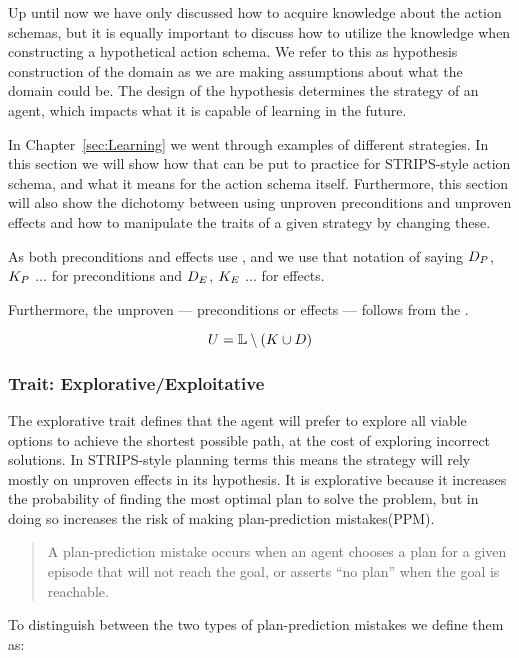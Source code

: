 \documentclass[\master/Master.tex]{subfiles}
\begin{document}
	Up until now we have only discussed how to acquire knowledge about the action schemas, but it is equally important to discuss how to utilize the knowledge when constructing a hypothetical action schema.
	We refer to this as hypothesis construction of the domain as we are making assumptions about what the domain could be.
	The design of the hypothesis determines the strategy of an agent, which impacts what it is capable of learning in the future.

	In Chapter~\ref{sec:Learning} we went through examples of different strategies. In this section we will show how that can be put to practice for STRIPS-style action schema, and what it means for the action schema itself.
	Furthermore, this section will also show the dichotomy between using unproven preconditions and unproven effects and how to manipulate the traits of a given strategy by changing these.

	As both preconditions and effects use \Pro, \Dsp and \Up we use that notation of saying $D_P$, $K_P$ $\dots$ for preconditions and
	$D_E$, $K_E$ $\dots$ for effects.
	
	Furthermore, the unproven \Up --- preconditions or effects --- follows from the .
	
	\begin{equation}
		 U = \mathbb{L} \setminus (K \cup D)
	\end{equation}

\subsubsection{Trait: Explorative/Exploitative}

	The explorative trait defines that the agent will prefer to explore all viable options to achieve the shortest possible path, at the cost of exploring incorrect solutions.
	In STRIPS-style planning terms this means the strategy will rely mostly on unproven effects in its hypothesis.
	It is explorative because it increases the probability of finding the most optimal plan to solve the problem,
	but in doing so increases the risk of making plan-prediction mistakes(PPM).
	\begin{quotation}
				A plan-prediction mistake occurs when an
				agent chooses a plan for a given episode that will not reach
				the goal, or asserts “no plan” when the goal is reachable. \cite{Walsh2008}
	\end{quotation}
	To distinguish between the two types of plan-prediction mistakes we define them as:
\end{document}
